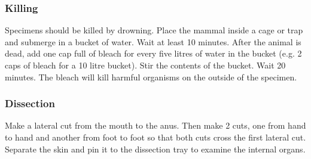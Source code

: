 \subsubsection{Killing}
Specimens should be killed by drowning. Place the mammal inside a cage or trap and submerge in a bucket of water. Wait at least 10 minutes. After the animal is dead, add one cap full of bleach for every five litres of water in the bucket (e.g. 2 caps of bleach for a 10 litre bucket). Stir the contents of the bucket. Wait 20 minutes. The bleach will kill harmful organisms on the outside of the specimen.

\subsubsection{Dissection}
Make a lateral cut from the mouth to the anus. Then make 2 cuts, one from hand to hand and another from foot to foot so that both cuts cross the first lateral cut. Separate the skin and pin it to the dissection tray to examine the internal organs.